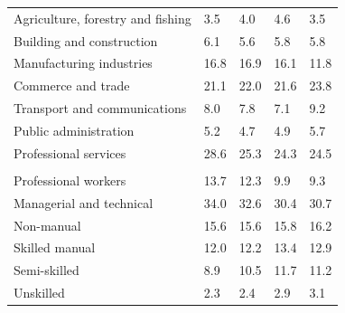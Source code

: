 \documentclass{article}
\begin{document}
\begin{table}[h]
\begin{tabular}{KTTTT}
    \hline
Agriculture, forestry and fishing  & 3.5& 4.0& 4.6& 3.5\\
Building and construction & 6.1& 5.6& 5.8& 5.8\\
Manufacturing industries & 16.8& 16.9& 16.1& 11.8\\
Commerce and trade  & 21.1& 22.0& 21.6& 23.8\\
Transport and communications  & 8.0& 7.8& 7.1& 9.2\\
Public administration & 5.2& 4.7& 4.9& 5.7\\
Professional services & 28.6& 25.3& 24.3& 24.5\\
\hline
    \\ 
    \hline
Professional workers  & 13.7& 12.3 &  9.9&  9.3\\
Managerial and technical & 34.0& 32.6& 30.4& 30.7\\
Non-manual & 15.6& 15.6& 15.8& 16.2\\
Skilled manual & 12.0& 12.2& 13.4& 12.9\\
Semi-skilled &  8.9& 10.5& 11.7& 11.2\\
Unskilled  & 2.3& 2.4& 2.9& 3.1\\
\end{tabular}
\end{table}
\pagebreak
\end{document}
